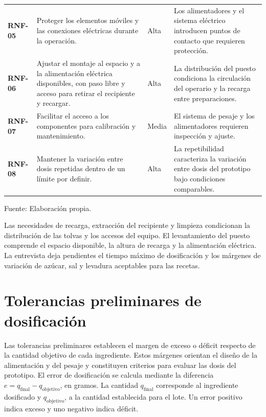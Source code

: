 \begin{table}[H]
\begin{tabularx}{\textwidth}{p{}p{}p{}X}
        \addlinespace[5pt]
        \textbf{RNF-05} & Proteger los elementos móviles y las conexiones eléctricas durante la operación. & Alta & Los alimentadores y el sistema eléctrico introducen puntos de contacto que requieren protección. \\
        \addlinespace[5pt]
        \textbf{RNF-06} & Ajustar el montaje al espacio y a la alimentación eléctrica disponibles, con paso libre y acceso para retirar el recipiente y recargar. & Alta & La distribución del puesto condiciona la circulación del operario y la recarga entre preparaciones. \\
        \addlinespace[5pt]
        \textbf{RNF-07} & Facilitar el acceso a los componentes para calibración y mantenimiento. & Media & El sistema de pesaje y los alimentadores requieren inspección y ajuste. \\
        \addlinespace[5pt]
        \textbf{RNF-08} & Mantener la variación entre dosis repetidas dentro de un límite por definir. & Alta & La repetibilidad caracteriza la variación entre dosis del prototipo bajo condiciones comparables. \\
        \bottomrule[1pt]
    \end{tabularx}
    \vspace{2pt}
    {\footnotesize Fuente: Elaboración propia.}
\end{table}

Las necesidades de recarga, extracción del recipiente y limpieza condicionan
la distribución de las tolvas y los accesos del equipo. El levantamiento
del puesto comprende el espacio disponible, la altura de recarga y la
alimentación eléctrica. La entrevista deja pendientes el tiempo máximo
de dosificación y los márgenes de variación de azúcar, sal y levadura
aceptables para las recetas.

\section{Tolerancias preliminares de dosificación}
\label{sec:tolerancias_preliminares}

Las tolerancias preliminares establecen el margen de exceso o déficit
respecto de la cantidad objetivo de cada ingrediente. Estos márgenes
orientan el diseño de la alimentación y del pesaje y constituyen
criterios para evaluar las dosis del prototipo. El error de dosificación
se calcula mediante la diferencia
\(e=q_{\mathrm{final}}-q_{\mathrm{objetivo}}\), en gramos. La cantidad
\(q_{\mathrm{final}}\) corresponde al ingrediente dosificado y
\(q_{\mathrm{objetivo}}\), a la cantidad establecida para el lote.
Un error positivo indica exceso y uno negativo indica déficit.

